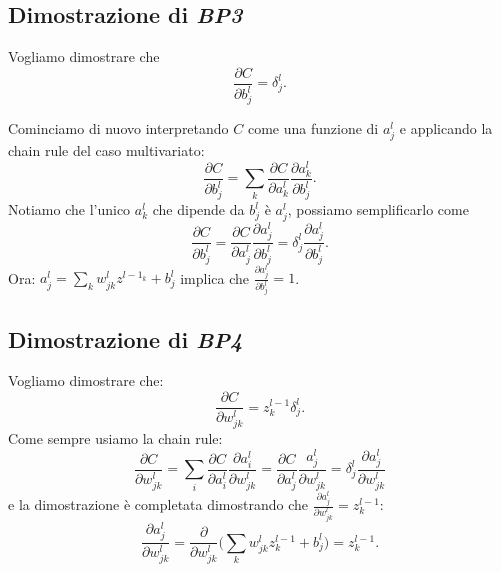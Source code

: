 \newpage
\subsection{Dimostrazione di \textit{BP3}}
Vogliamo dimostrare che
\begin{equation}
    \frac{\partial C}{\partial b^l_j} = \delta^l_j.
\end{equation}

Cominciamo di nuovo interpretando $C$ come una funzione di $a^l_j$ e applicando la chain rule del caso multivariato:
\begin{equation}
    \frac{\partial C}{\partial b^l_j} = \sum_k \frac{\partial C}{\partial  a^l_k}\frac{\partial a^l_k}{\partial b^l_j}.
\end{equation}
Notiamo che l'unico $a^l_k$ che dipende da $b^l_j$ è $a^l_j$, possiamo semplificarlo come 
\begin{equation}
    \frac{\partial C}{\partial b^l_j} = \frac{\partial C}{\partial a^l_j}\frac{\partial a^l_j}{\partial b^l_j} = \delta^l_j\frac{\partial a^l_j}{\partial b^l_j}.
\end{equation}
Ora: $a^l_j=\sum_kw^l_{jk}z^{l-1_k}+b^l_j$ implica che $\frac{\partial a^l_j}{\partial b^l_j}=1$.

\subsection{Dimostrazione di \textit{BP4}}
Vogliamo dimostrare che:
\begin{equation}
    \frac{\partial C}{\partial w^l_{jk}} = z^{l-1}_k\delta^l_j.
\end{equation}
Come sempre usiamo la chain rule:
\begin{equation}
    \frac{\partial C}{\partial w^l_{jk}} = \sum_i\frac{\partial C}{\partial a^l_i}\frac{\partial a^l_i}{\partial w^l_{jk}} = \frac{\partial C}{\partial a^l_j}\frac{a^l_j}{\partial w^l_{jk}} = \delta^l_j \frac{\partial a^l_j}{\partial w^l_{jk}}
\end{equation}
e la dimostrazione è completata dimostrando che $\frac{\partial a^l_j}{\partial w^l_{jk}}=z^{l-1}_k$:
\begin{equation}
    \frac{\partial a^l_j}{\partial w^l_{jk}} = \frac{\partial }{\partial w^l_{jk}}\Big( \sum_kw^l_{jk} z^{l-1}_k + b^l_j\Big) = z^{l-1}_k.
\end{equation}
\newpage
